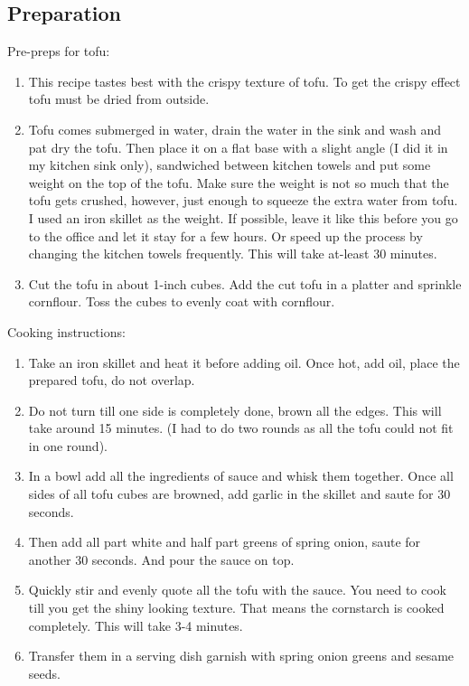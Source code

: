 \documentclass[
  oneside]{book}
\begin{document}
\hypertarget{preparation}{%
\subsection{Preparation}\label{preparation}}

Pre-preps for tofu:

\begin{enumerate}
\def\labelenumi{\arabic{enumi}.}
\item
  This recipe tastes best with the crispy texture of tofu. To get the crispy effect tofu must be dried from outside.
\item
  Tofu comes submerged in water, drain the water in the sink and wash and pat dry the tofu. Then place it on a flat base with a slight angle (I did it in my kitchen sink only), sandwiched between kitchen towels and put some weight on the top of the tofu. Make sure the weight is not so much that the tofu gets crushed, however, just enough to squeeze the extra water from tofu. I used an iron skillet as the weight.
  If possible, leave it like this before you go to the office and let it stay for a few hours. Or speed up the process by changing the kitchen towels frequently. This will take at-least 30 minutes.
\item
  Cut the tofu in about 1-inch cubes. Add the cut tofu in a platter and sprinkle cornflour. Toss the cubes to evenly coat with cornflour.
\end{enumerate}

Cooking instructions:

\begin{enumerate}
\def\labelenumi{\arabic{enumi}.}
\item
  Take an iron skillet and heat it before adding oil. Once hot, add oil, place the prepared tofu, do not overlap.
\item
  Do not turn till one side is completely done, brown all the edges. This will take around 15 minutes. (I had to do two rounds as all the tofu could not fit in one round).
\item
  In a bowl add all the ingredients of sauce and whisk them together. Once all sides of all tofu cubes are browned, add garlic in the skillet and saute for 30 seconds.
\item
  Then add all part white and half part greens of spring onion, saute for another 30 seconds. And pour the sauce on top.
\item
  Quickly stir and evenly quote all the tofu with the sauce. You need to cook till you get the shiny looking texture. That means the cornstarch is cooked completely. This will take 3-4 minutes.
\item
  Transfer them in a serving dish garnish with spring onion greens and sesame seeds.
\end{enumerate}
\end{document}
